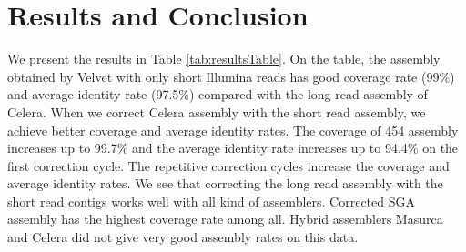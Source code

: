\documentclass[12pt]{article}
\begin{document}

\section{Results and Conclusion}
\label{res}
We present the results in Table \ref{tab:resultsTable}. On the table, the assembly obtained by Velvet with only short Illumina reads has good coverage rate (99\%) and average identity rate (97.5\%) compared with the long read assembly of Celera. When we correct Celera assembly with the short read assembly, we achieve better coverage and average identity rates. The coverage of 454 assembly increases up to 99.7\% and the average identity rate increases up to 94.4\% on the first correction cycle. The repetitive correction cycles increase the coverage and average identity rates. We see that correcting the long read assembly with the short read contigs works well with all kind of assemblers. Corrected SGA assembly has the highest coverage rate among all. Hybrid assemblers Masurca and Celera did not give very good assembly rates on this data.
\end{document}
